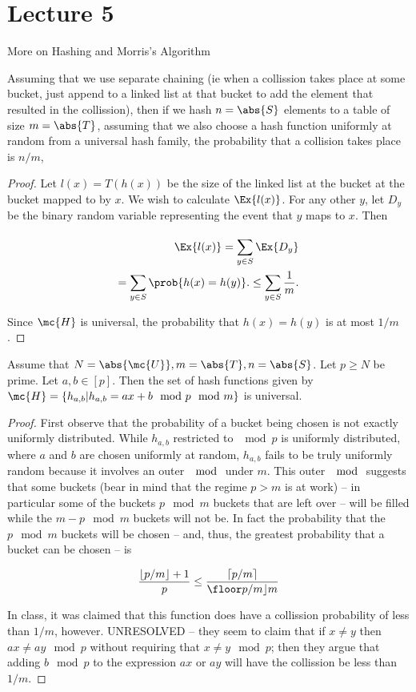 \documentclass[../main.tex]{subfiles}
\begin{document}
\section{Lecture 5}{More on Hashing and Morris's Algorithm}
\begin{theorem}
    Assuming that we use separate chaining (ie when a collission takes place at some bucket, just append to a linked list at that bucket to add the element that resulted in the collission), then if we hash $n = \abs{S}$ elements to a table of size $m = \abs{T}$, assuming that we also choose a hash function uniformly at random from a universal hash family, the probability that a collision takes place is $n/m$,
\end{theorem}
\begin{proof}
    Let $l(x) = T(h(x))$ be the size of the linked list at the bucket at the bucket mapped to by $x$. We wish to calculate
    $\Ex{l(x)}$. For any other $y$, let $D_y$ be the binary random variable representing the event that $y$ maps to $x$. Then

    \begin{align*}
        \Ex{l(x)} = \sum_{y \in S}^{}\Ex{D_{y}} \\
         = \sum_{y \in S}^{}\prob{h(x) = h(y)}.
         \leq \sum_{y \in S}^{}\frac{1}{m}.
    \end{align*}

    Since $\mc{H}$ is universal, the probability that $h(x)
    = h(y)$ is at most $1/m$.
\end{proof}

\begin{theorem}
    Assume that $N =\abs{\mc{U}}, m = \abs{T}, n = \abs{S}$. Let $p \geq N$ be prime. Let $a,b \in [p]$. Then the set of hash functions given by
    $\mc{H} = \left\{h_{a,b}| h_{a,b} = ax + b \mod p \mod m  \right\}$ is universal.
\end{theorem}

\begin{proof}
    First observe that the probability of a bucket being chosen is not exactly uniformly distributed. While $h_{a,b}$ restricted to $\mod p$ is uniformly distributed, where $a$ and $b$ are chosen uniformly at random, $h_{a,b}$ fails to be truly uniformly random because it involves an outer $\mod$ under $m$. This outer $\mod$ suggests that some buckets (bear in mind that
    the regime $p > m$ is at work) -- in particular some of the buckets $p \mod m$ buckets that are left over -- will be filled while the $m - p \mod m$ buckets will not be. In fact the probability that the $p \mod m$ buckets will be chosen -- and, thus, the greatest probability that a bucket can be chosen -- is

    \[
        \frac{\lfloor p/m \rfloor + 1}{p} \leq \frac{\lceil p/m \rceil}{\floor p/m \rfloor m} 
    \]


    In class, it was claimed that this function does have a collission probability of less than $1/m$, however. UNRESOLVED -- they seem to claim that if $x \not = y$ then $ax \not = ay \mod p$ without requiring that $x \not = y \mod p$; then they argue that adding $b \mod p$ to the expression $ax$ or $ay$ will have the collission be less than $1/m$.
\end{proof}
\end{document}
